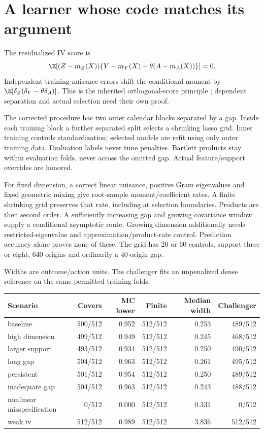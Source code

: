 \section{A learner whose code matches its argument}
The residualized IV score is
\[
 \E[(Z-m_Z(X))\{Y-m_Y(X)-\theta(A-m_A(X))\}]=0.
\]
Independent-training nuisance errors shift the conditional moment by $\E[\delta_Z(\delta_Y-\theta\delta_A)]$. This is the inherited orthogonal-score principle \cite{dml2018}; dependent separation and actual selection need their own proof.

The corrected procedure has two outer calendar blocks separated by a gap. Inside each training block a further separated split selects a shrinking lasso grid. Inner training controls standardization; selected models are refit using only outer training data. Evaluation labels never tune penalties. Bartlett products stay within evaluation folds, never across the omitted gap. Actual feature/support overrides are honored.

For fixed dimension, a correct linear nuisance, positive Gram eigenvalues and fixed geometric mixing give root-sample moment/coefficient rates. A finite shrinking grid preserves that rate, including at selection boundaries. Products are then second order. A sufficiently increasing gap and growing covariance window supply a conditional asymptotic route. Growing dimension additionally needs restricted-eigenvalue and approximation/product-rate control. Prediction accuracy alone proves none of these. The grid has 20 or 60 controls, support three or eight, 640 origins and ordinarily a 40-origin gap.

Widths are outcome/action units. The challenger fits an unpenalized dense reference on the same permitted training folds.

\begin{center}\footnotesize\begin{tabular}{lrrrrr}\toprule
Scenario & Covers & MC lower & Finite & Median width & Challenger\\
\midrule
baseline & 500/512 & 0.952 & 512/512 & 0.253 & 489/512 \\
high dimension & 499/512 & 0.949 & 512/512 & 0.245 & 468/512 \\
larger support & 493/512 & 0.934 & 512/512 & 0.250 & 490/512 \\
long gap & 504/512 & 0.963 & 512/512 & 0.261 & 495/512 \\
persistent & 501/512 & 0.954 & 512/512 & 0.250 & 489/512 \\
inadequate gap & 504/512 & 0.963 & 512/512 & 0.243 & 488/512 \\
nonlinear misspecification & 0/512 & 0.000 & 512/512 & 0.331 & 0/512 \\
weak iv & 512/512 & 0.989 & 512/512 & 3.836 & 512/512 \\
\bottomrule\end{tabular}\end{center}



